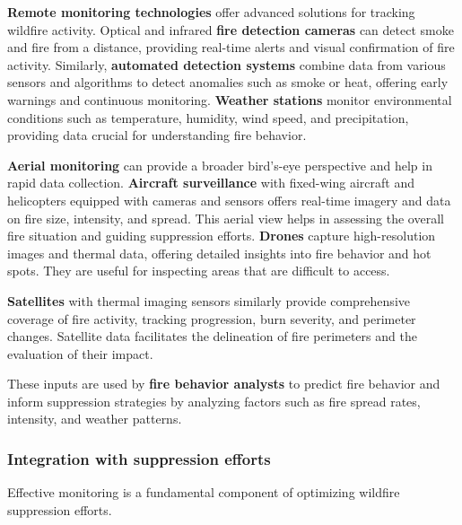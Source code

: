 \documentclass[
  12 pt,
]{Nemilov}
\begin{document}
\textbf{Remote monitoring technologies} offer advanced solutions for tracking wildfire activity. Optical and infrared \textbf{fire detection cameras} can detect smoke and fire from a distance, providing real-time alerts and visual confirmation of fire activity. Similarly, \textbf{automated detection systems} combine data from various sensors and algorithms to detect anomalies such as smoke or heat, offering early warnings and continuous monitoring. \textbf{Weather stations} monitor environmental conditions such as temperature, humidity, wind speed, and precipitation, providing data crucial for understanding fire behavior.

\textbf{Aerial monitoring} can provide a broader bird's-eye perspective and help in rapid data collection. \textbf{Aircraft surveillance} with fixed-wing aircraft and helicopters equipped with cameras and sensors offers real-time imagery and data on fire size, intensity, and spread. This aerial view helps in assessing the overall fire situation and guiding suppression efforts. \textbf{Drones} capture high-resolution images and thermal data, offering detailed insights into fire behavior and hot spots. They are useful for inspecting areas that are difficult to access.

\textbf{Satellites} with thermal imaging sensors similarly provide comprehensive coverage of fire activity, tracking progression, burn severity, and perimeter changes. Satellite data facilitates the delineation of fire perimeters and the evaluation of their impact.

These inputs are used by \textbf{fire behavior analysts} to predict fire behavior and inform suppression strategies by analyzing factors such as fire spread rates, intensity, and weather patterns.

\subsubsection{Integration with suppression efforts}\label{integration-with-suppression-efforts}

Effective monitoring is a fundamental component of optimizing wildfire suppression efforts.
\end{document}
